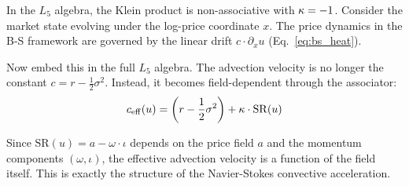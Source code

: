 In the $L_5$ algebra, the Klein product is non-associative with $\kappa = -1$. Consider the market state evolving under the log-price coordinate $x$. The price dynamics in the B-S framework are governed by the linear drift $c \cdot \partial_x u$ (Eq.~\ref{eq:bs_heat}).

Now embed this in the full $L_5$ algebra. The advection velocity is no longer the constant $c = r - \frac{1}{2}\sigma^2$. Instead, it becomes field-dependent through the associator:
\begin{equation}\label{eq:metareal_advection}
    c_{\mathrm{eff}}(u) = \left(r - \frac{1}{2}\sigma^2\right) + \kappa \cdot \mathrm{SR}(u)
\end{equation}

Since $\mathrm{SR}(u) = a - \omega\cdot\iota$ depends on the price field $a$ and the momentum components $(\omega, \iota)$, the effective advection velocity is a function of the field itself. This is exactly the structure of the Navier-Stokes convective acceleration.

